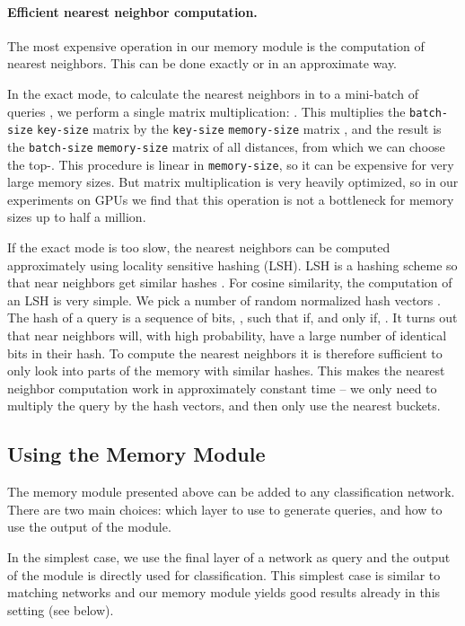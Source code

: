 \documentclass{article} \usepackage{iclr2017_conference,times}
\begin{document}
\paragraph{Efficient nearest neighbor computation.}
The most expensive operation in our memory module is
the computation of  nearest neighbors. This can be done exactly or in an approximate way.

In the exact mode, to calculate the nearest neighbors in  to a mini-batch
of queries , we perform a single matrix multiplication:
. This multiplies the \texttt{batch-size}  \texttt{key-size}
matrix  by the \texttt{key-size}  \texttt{memory-size} matrix ,
and the result is the \texttt{batch-size}  \texttt{memory-size} matrix
of all distances, from which we can choose the top-. This procedure is
linear in \texttt{memory-size}, so it can be expensive for very large memory
sizes. But matrix multiplication is very heavily optimized, so in our experiments
on GPUs we find that this operation is not a bottleneck for memory sizes up to
half a million.

If the exact mode is too slow, the  nearest neighbors can be computed
approximately using locality sensitive hashing (LSH). LSH is a hashing 
scheme so that near neighbors get similar hashes \citep{indyk1998approximate,  lsh}.
For cosine similarity, the computation of
an LSH is very simple. We pick a number of random normalized hash vectors
. The hash of a query  is a sequence of  bits,
, such that  if, and only if, .
It turns out that near neighbors will, with high probability, have
a large number of identical bits in their hash. To compute the nearest
neighbors it is therefore sufficient to only look into parts of the memory
with similar hashes. This makes the nearest neighbor computation work in
approximately constant time -- we only need to multiply the query by the hash
vectors, and then only use the nearest buckets.

\subsection{Using the Memory Module}

The memory module presented above can be added to any classification network.
There are two main choices: which layer to use to generate queries,
and how to use the output of the module.

In the simplest case, we use the final layer of a network as query and
the output of the module is directly used for classification. This simplest
case is similar to matching networks \citep{matching_nets}
and our memory module yields good results already
in this setting (see below).
\end{document}
